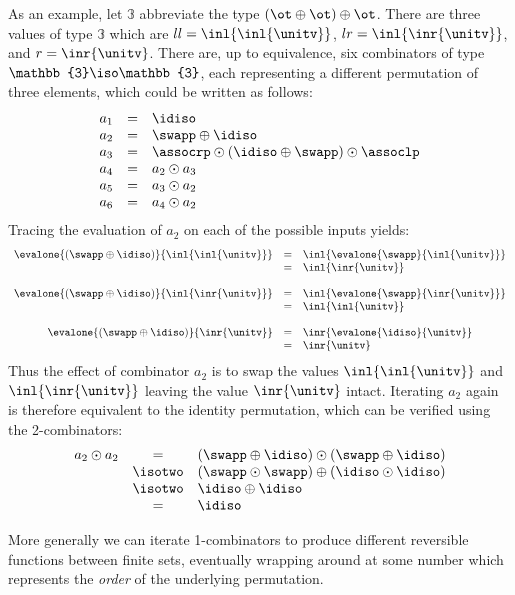 As an example, let $\mathbb{3}$ abbreviate the type
$(\ot \oplus \ot) \oplus \ot$. There are three values of type $\mathbb{3}$ which
are $ll=\inl{\inl{\unitv}}$, $lr=\inl{\inr{\unitv}}$, and
$r=\inr{\unitv}$. There are, up to equivalence, six combinators of type
$\mathbb{3} \iso \mathbb{3}$, each representing a different permutation of three
elements, which could be written as follows:
\[\begin{array}{rcl}
a_1 &=& \idiso \\
a_2 &=& \swapp \oplus \idiso \\
a_3 &=& \assocrp \odot (\idiso \oplus \swapp) \odot \assoclp \\
a_4 &=& a_2 \odot a_3 \\
a_5 &=& a_3 \odot a_2 \\
a_6 &=& a_4 \odot a_2
\end{array}\]
Tracing the evaluation of $a_2$ on each of the possible inputs yields:
\[\begin{array}{rcl}
\evalone{(\swapp\oplus\idiso)}{\inl{\inl{\unitv}}} &=& \inl{\evalone{\swapp}{\inl{\unitv}}} \\
&=& \inl{\inr{\unitv}} \\
\\
\evalone{(\swapp\oplus\idiso)}{\inl{\inr{\unitv}}} &=& \inl{\evalone{\swapp}{\inr{\unitv}}} \\
&=& \inl{\inl{\unitv}} \\
\\
\evalone{(\swapp\oplus\idiso)}{\inr{\unitv}} &=& \inr{\evalone{\idiso}{\unitv}} \\
&=& \inr{\unitv}
\end{array}\]
Thus the effect of combinator $a_2$ is to swap the values
$\inl{\inl{\unitv}}$ and $\inl{\inr{\unitv}}$ leaving the value
$\inr{\unitv}$ intact. Iterating $a_2$ again is therefore equivalent
to the identity permutation, which can be verified using the
2-combinators:
\[\begin{array}{rcl}
a_2 \odot a_2 &=& (\swapp \oplus \idiso) \odot (\swapp \oplus \idiso) \\
&\isotwo& (\swapp \odot \swapp) \oplus (\idiso \odot \idiso) \\
&\isotwo& \idiso \oplus \idiso \\
&=& \idiso
\end{array}\]

More generally we can iterate 1-combinators to produce different
reversible functions between finite sets, eventually wrapping around
at some number which represents the \emph{order} of the underlying
permutation.

